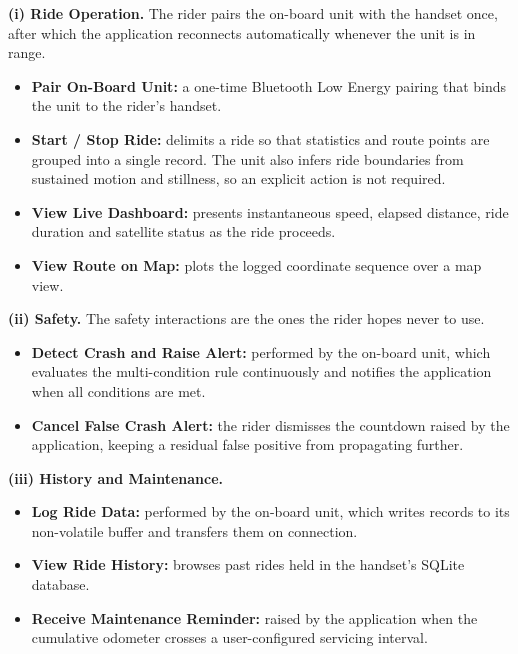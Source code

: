 \documentclass[12pt,a4paper,oneside]{report}
\begin{document}
\vspace{0.4em}
\noindent\textbf{(i) Ride Operation.} The rider pairs the on-board unit with the handset
once, after which the application reconnects automatically whenever the unit is in range.

\begin{itemize}[leftmargin=*,itemsep=0.3em,topsep=0.45em]
\item \textbf{Pair On-Board Unit:} a one-time Bluetooth Low Energy pairing that binds the
unit to the rider's handset.
\item \textbf{Start / Stop Ride:} delimits a ride so that statistics and route points are
grouped into a single record. The unit also infers ride boundaries from sustained motion
and stillness, so an explicit action is not required.
\item \textbf{View Live Dashboard:} presents instantaneous speed, elapsed distance, ride
duration and satellite status as the ride proceeds.
\item \textbf{View Route on Map:} plots the logged coordinate sequence over a map view.
\end{itemize}

\noindent\textbf{(ii) Safety.} The safety interactions are the ones the rider hopes never to
use.

\begin{itemize}[leftmargin=*,itemsep=0.3em,topsep=0.45em]
\item \textbf{Detect Crash and Raise Alert:} performed by the on-board unit, which evaluates
the multi-condition rule continuously and notifies the application when all conditions are
met.
\item \textbf{Cancel False Crash Alert:} the rider dismisses the countdown raised by the
application, keeping a residual false positive from propagating further.
\end{itemize}

\noindent\textbf{(iii) History and Maintenance.}

\begin{itemize}[leftmargin=*,itemsep=0.3em,topsep=0.45em]
\item \textbf{Log Ride Data:} performed by the on-board unit, which writes records to its
non-volatile buffer and transfers them on connection.
\item \textbf{View Ride History:} browses past rides held in the handset's SQLite database.
\item \textbf{Receive Maintenance Reminder:} raised by the application when the cumulative
odometer crosses a user-configured servicing interval.
\end{itemize}
\end{document}
